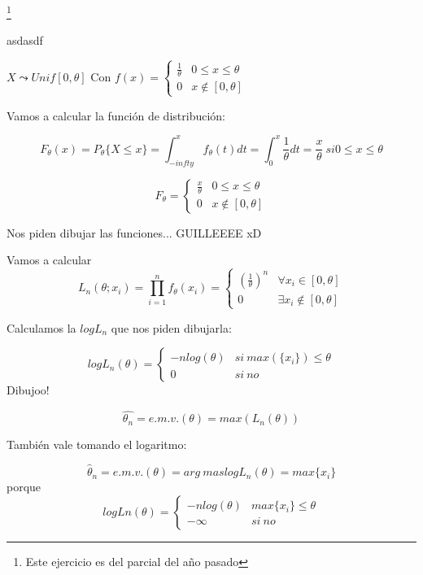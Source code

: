 \begin{problem}[11]
\footnote{Este ejercicio es del parcial del año pasado}

asdasdf
\solution

$X\leadsto Unif[0,\theta]$
Con $f(x) = \displaystyle\left\{\begin{array}{cc}
\frac{1}{\theta} & 0\leq x \leq \theta\\
0 & x \notin [0,\theta]
\end{array}\right.$

Vamos a calcular la función de distribución:

\[F_{\theta} (x) = P_{\theta}\{X\leq x\} = \int_{-infty}^x f_{\theta}(t)dt = \int_0^x \frac{1}{\theta} dt = \frac{x}{\theta} \ si 0\leq x \leq \theta\]

\[F_{\theta} = \left\{\begin{array}{cc}
\frac{x}{\theta} & 0\leq x \leq \theta\\
0 & x \notin [0,\theta]
\end{array}\right.\]

Nos piden dibujar las funciones... GUILLEEEE xD

Vamos a calcular \[L_n(\theta;x_i) = \prod_{i=1}^n f_{\theta} (x_i) = \left\{\begin{array}{cc}
\left(\frac{1}{\theta}\right)^n & \forall x_i \in [0,\theta]\\
0 & \exists x_i\notin [0,\theta]
\end{array}\right.\]

Calculamos la $logL_n$ que nos piden dibujarla:

\[logL_n(\theta) = \left\{\begin{array}{cc}
-nlog(\theta) & si \ max(\{x_i\})\leq \theta\\
0 & si \ no
\end{array}\right.\]
Dibujoo!

\[\hat{\theta_n} = e.m.v.(\theta) = max\left(L_n(\theta)\right)\]

También vale tomando el logaritmo:

\[\hat{\theta}_n = e.m.v. (\theta) = arg\ mas logL_n(\theta) = max\{x_i\}\]
porque \[ logLn(\theta) = \displaystyle\left\{\begin{array}{cc}
-nlog(\theta) & max\{x_i\} \leq \theta\\
-\infty & si \ no
\end{array}\right.\]
\end{problem}


